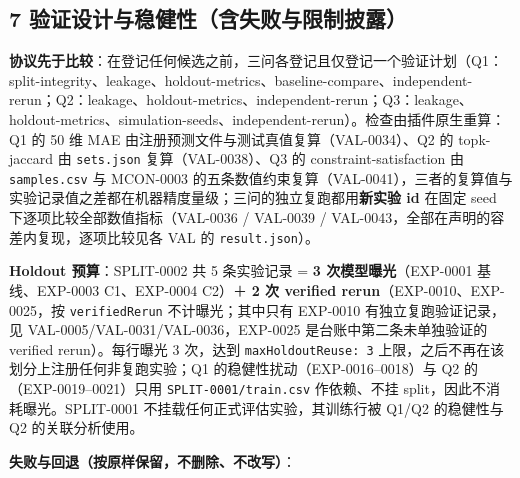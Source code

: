 \documentclass[
  11pt,
]{article}
\begin{document}
\subsection{7
验证设计与稳健性（含失败与限制披露）}\label{ux9a8cux8bc1ux8bbeux8ba1ux4e0eux7a33ux5065ux6027ux542bux5931ux8d25ux4e0eux9650ux5236ux62abux9732}

\textbf{协议先于比较}：在登记任何候选之前，三问各登记且仅登记一个验证计划（Q1：split-integrity、leakage、holdout-metrics、baseline-compare、independent-rerun；Q2：leakage、holdout-metrics、independent-rerun；Q3：leakage、holdout-metrics、simulation-seeds、independent-rerun）。检查由插件原生重算：Q1
的 50 维 MAE 由注册预测文件与测试真值复算（VAL-0034）、Q2 的
topk-jaccard 由 \texttt{sets.json} 复算（VAL-0038）、Q3 的
constraint-satisfaction 由 \texttt{samples.csv} 与 MCON-0003
的五条数值约束复算（VAL-0041），三者的复算值与实验记录值之差都在机器精度量级；三问的独立复跑都用\textbf{新实验
id} 在固定 seed 下逐项比较全部数值指标（VAL-0036 / VAL-0039 /
VAL-0043，全部在声明的容差内复现，逐项比较见各 VAL 的
\texttt{result.json}）。

\textbf{Holdout 预算}：SPLIT-0002 共 5 条实验记录 = \textbf{3
次模型曝光}（EXP-0001 基线、EXP-0003 C1、EXP-0004 C2）＋ \textbf{2 次
verified rerun}（EXP-0010、EXP-0025，按 \texttt{verifiedRerun}
不计曝光；其中只有 EXP-0010 有独立复跑验证记录，见
VAL-0005/VAL-0031/VAL-0036，EXP-0025 是台账中第二条未单独验证的 verified
rerun）。每行曝光 3 次，达到 \texttt{maxHoldoutReuse:\ 3}
上限，之后不再在该划分上注册任何非复跑实验；Q1
的稳健性扰动（EXP-0016--0018）与 Q2 的（EXP-0019--0021）只用
\texttt{SPLIT-0001/train.csv} 作依赖、不挂
split，因此不消耗曝光。SPLIT-0001 不挂载任何正式评估实验，其训练行被
Q1/Q2 的稳健性与 Q2 的关联分析使用。

\textbf{失败与回退（按原样保留，不删除、不改写）}：
\end{document}
